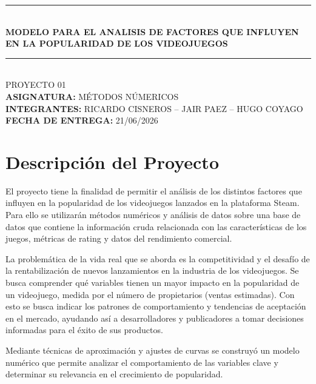 \documentclass[12pt]{report}
\begin{document}
\thispagestyle{empty}
\vspace*{2cm}
\begin{center}
    \noindent\rule{\textwidth}{0.4pt}\\[0.5cm]
    {\Huge\bfseries MODELO PARA EL ANALISIS DE FACTORES QUE INFLUYEN EN LA POPULARIDAD DE LOS VIDEOJUEGOS}\\[0.5cm]
    \noindent\rule{\textwidth}{0.4pt}\\[0.5cm]
    {\large PROYECTO 01}\\[2cm]
    \textbf{ASIGNATURA:} \hspace{1cm} MÉTODOS NÚMERICOS\\[0.2cm]
    
    \textbf{INTEGRANTES:} \hspace{1cm} RICARDO CISNEROS -- JAIR PAEZ -- HUGO COYAGO\\[2cm]
    
    \textbf{FECHA DE ENTREGA:} \hspace{0.5cm} 21/06/2026
\end{center}
\newpage


\tableofcontents
\thispagestyle{empty}
\newpage

\setcounter{page}{1}

\section*{Descripción del Proyecto}

El proyecto tiene la finalidad de permitir el análisis de los distintos factores que influyen en la popularidad de los videojuegos lanzados en la plataforma Steam. Para ello se utilizarán métodos numéricos y análisis de datos sobre una base de datos que contiene la información cruda relacionada con las características de los juegos, métricas de rating y datos del rendimiento comercial.

La problemática de la vida real que se aborda es la competitividad y el desafío de la rentabilización de nuevos lanzamientos en la industria de los videojuegos. Se busca comprender qué variables tienen un mayor impacto en la popularidad de un videojuego, medida por el número de propietarios (ventas estimadas). Con esto se busca indicar los patrones de comportamiento y tendencias de aceptación en el mercado, ayudando así a desarrolladores y publicadores a tomar decisiones informadas para el éxito de sus productos.

Mediante técnicas de aproximación y ajustes de curvas se construyó un modelo numérico que permite analizar el comportamiento de las variables clave y determinar su relevancia en el crecimiento de popularidad.
\end{document}
